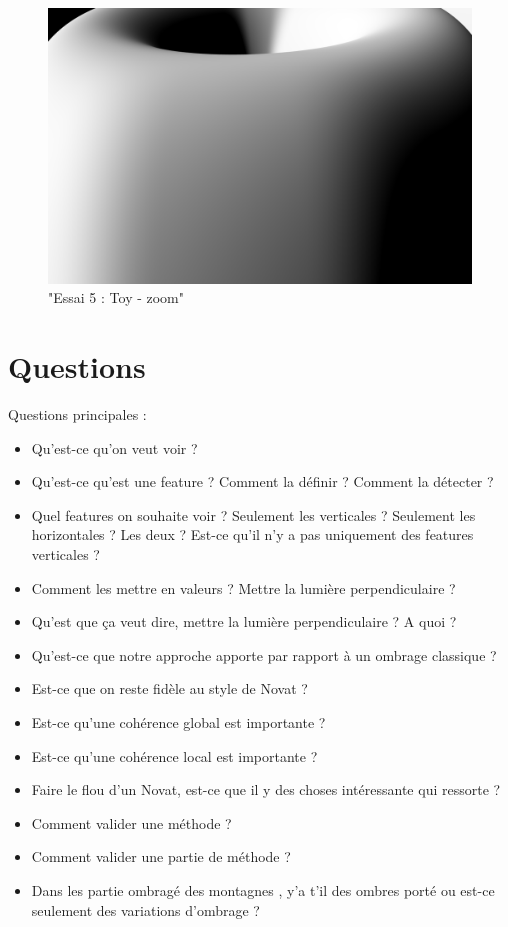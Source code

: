 \documentclass[a4paper]{article}
\begin{document}
\begin{figure}[thb]
	\centering
    \includegraphics[scale=0.3]{Images/Essais/Essai_6_toy_zoom.png}
    \caption{"Essai 5 : Toy  - zoom"}
 \end{figure}
 
 
\section{Questions}

Questions principales :
\begin{itemize}
\item Qu'est-ce qu'on veut voir ?
\item Qu'est-ce qu'est une feature ? Comment la définir ? Comment la détecter ? 
\item Quel features on souhaite voir ? Seulement les verticales ? Seulement les horizontales ? Les deux ? Est-ce qu'il n'y a pas uniquement des features verticales ? 
\item Comment les mettre en valeurs ? Mettre la lumière perpendiculaire ?
\item Qu'est que ça veut dire, mettre la lumière perpendiculaire ? A quoi ? 
\item Qu'est-ce que notre approche apporte par rapport à un ombrage classique ? 
\item Est-ce que on reste fidèle au style de Novat ?
\item Est-ce qu'une cohérence global est importante ? 
\item Est-ce qu'une cohérence local est importante ? 
\item Faire le flou d'un Novat, est-ce que il y des choses intéressante qui ressorte ? 
\item Comment valider une méthode ? 
\item Comment valider une partie de méthode ? 
\item Dans les partie ombragé des montagnes , y'a t'il des ombres porté ou est-ce seulement des variations d'ombrage ? 
\end{itemize}
\end{document}
